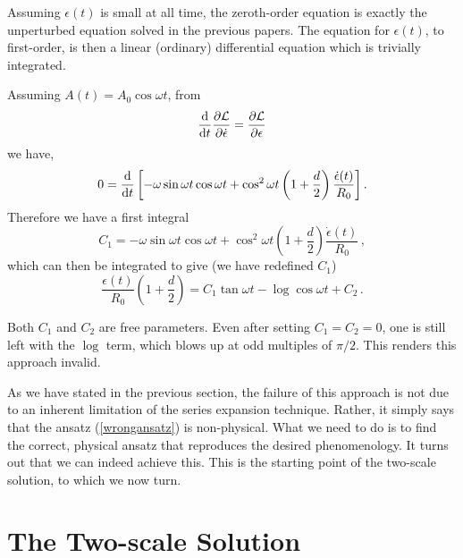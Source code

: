 \documentclass[11pt]{book}
\begin{document}
Assuming $\epsilon(t)$ is small at all time, the zeroth-order equation is exactly the unperturbed equation solved in the previous papers. The equation for $\epsilon(t)$, to first-order, is then a linear (ordinary) differential equation which is trivially integrated.

Assuming $A(t)=A_0\cos\omega t$, from
\begin{equation}
  \frac{\rm d}{{\rm d}t}\frac{\partial \mathcal{L}}{\partial \dot{\epsilon}} =
  \frac{\partial\mathcal{L}}{\partial \epsilon}
\end{equation}
we have,
\begin{equation}
  0 = \frac{\rm d}{{\rm d}t}\left[-\omega\sin\omega t\cos\omega t + \cos^2\omega t\left(1+\frac{d}{2}
    \right)\frac{\dot{\epsilon}(t)}{R_0}\right].
\end{equation}
Therefore we have a first integral
\begin{equation}
  C_1 = -\omega\sin\omega t\cos\omega t + \cos^2\omega t\left(1+\frac{d}{2}
  \right)\frac{\dot{\epsilon}(t)}{R_0}\,,
\end{equation}
which can then be integrated to give (we have redefined $C_1$)
\begin{equation}\label{sol}
  \frac{\epsilon(t)}{R_0}\left(1+\frac{d}{2}\right)
  = C_1\tan\omega t  - \log\cos\omega t + C_2\,.
\end{equation}

Both $C_1$ and $C_2$ are free parameters. Even after setting $C_1=C_2=0$, one is still left with the $\log$ term, which blows up at odd multiples of $\pi/2$. This renders this approach invalid.

As we have stated in the previous section, the failure of this approach is not due to an inherent limitation of the series expansion technique. Rather, it simply says that the ansatz (\ref{wrongansatz}) is non-physical. What we need to do is to find the correct, physical ansatz that reproduces the desired phenomenology. It turns out that we can indeed achieve this. This is the starting point of the two-scale solution, to which we now turn.

\chapter{The Two-scale Solution}\label{exactsol}
\end{document}
